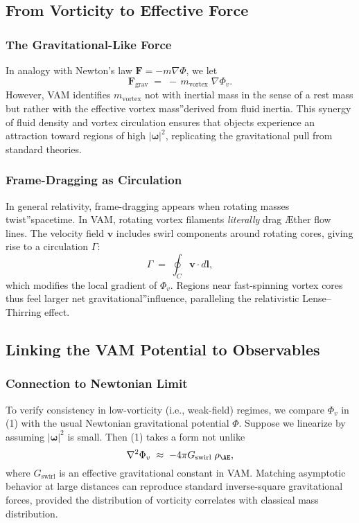 \subsection{From Vorticity to Effective Force}
\subsubsection{The Gravitational-Like Force}

In analogy with Newton's law \(\mathbf{F} = -m \nabla \Phi\), we let
\[
    \mathbf{F}_{\mathrm{grav}} \;=\; -\,m_{\mathrm{vortex}}\;\nabla \Phi_v.
\]
However, VAM identifies \(m_{\mathrm{vortex}}\) not with inertial mass in the sense of a rest mass but rather with the effective vortex \grqq mass\textquotedblright derived from fluid inertia. This synergy of fluid density and vortex circulation ensures that objects experience an attraction toward regions of high \(\lvert \boldsymbol{\omega} \rvert^2\), replicating the gravitational pull from standard theories.

\subsubsection{Frame-Dragging as Circulation}

In general relativity, frame-dragging appears when rotating masses \grqq twist\textquotedblright spacetime. In VAM, rotating vortex filaments \textit{literally} drag Æther flow lines. The velocity field \(\mathbf{v}\) includes swirl components around rotating cores, giving rise to a circulation \(\Gamma\):
\[
    \Gamma \;=\; \oint_C \mathbf{v}\cdot d\mathbf{l},
\]
which modifies the local gradient of \(\Phi_v\). Regions near fast-spinning vortex cores thus feel larger net \grqq gravitational\textquotedblright influence, paralleling the relativistic Lense–Thirring effect.

\subsection{Linking the VAM Potential to Observables}

\subsubsection{Connection to Newtonian Limit}

To verify consistency in low-vorticity (i.e., weak-field) regimes, we compare \(\Phi_v\) in (1) with the usual Newtonian gravitational potential \(\Phi\). Suppose we linearize by assuming \(\lvert \boldsymbol{\omega} \rvert^2\) is small. Then (1) takes a form not unlike
\[
    \nabla^2 \Phi_v \;\approx\; -4\pi G_{\mathrm{swirl}}\;\rho_{\mathrm{\AE}},
\]
where \(G_{\mathrm{swirl}}\) is an effective gravitational constant in VAM. Matching asymptotic behavior at large distances can reproduce standard inverse-square gravitational forces, provided the distribution of vorticity correlates with classical mass distribution.

